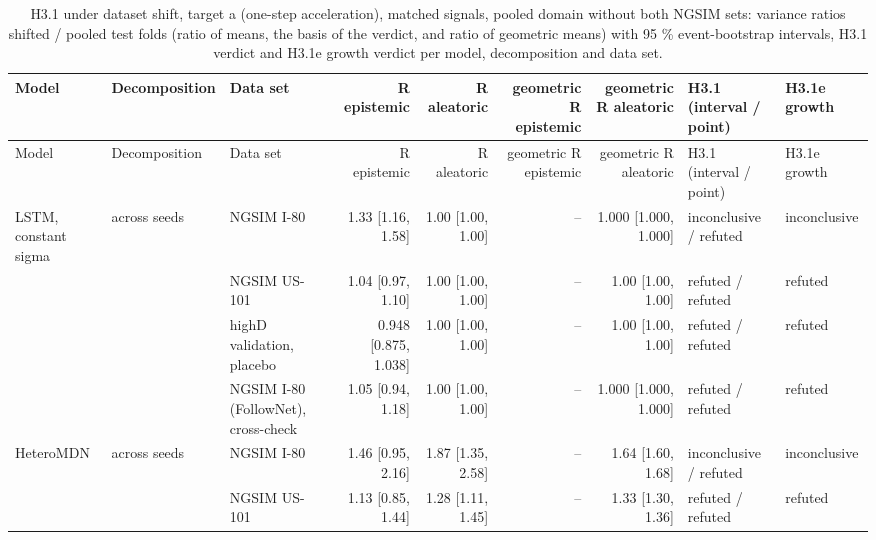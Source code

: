 \begingroup
\footnotesize
\begin{longtable}{lllrrrrll}
\caption{H3.1 under dataset shift, target a (one-step acceleration), matched signals, pooled domain without both NGSIM sets: variance ratios shifted / pooled test folds (ratio of means, the basis of the verdict, and ratio of geometric means) with 95 \% event-bootstrap intervals, H3.1 verdict and H3.1e growth verdict per model, decomposition and data set.}\label{tab:t2-h31--lodo-ngsim-all--a} \\
\toprule
Model & Decomposition & Data set & R epistemic & R aleatoric & geometric R epistemic & geometric R aleatoric & H3.1 (interval / point) & H3.1e growth \\
\midrule
\endfirsthead
\toprule
Model & Decomposition & Data set & R epistemic & R aleatoric & geometric R epistemic & geometric R aleatoric & H3.1 (interval / point) & H3.1e growth \\
\midrule
\endhead
\bottomrule
\endlastfoot
LSTM, constant sigma & across seeds & NGSIM I-80 & 1.33 [1.16, 1.58] & 1.00 [1.00, 1.00] & -- & 1.000 [1.000, 1.000] & inconclusive / refuted & inconclusive \\
 &  & NGSIM US-101 & 1.04 [0.97, 1.10] & 1.00 [1.00, 1.00] & -- & 1.00 [1.00, 1.00] & refuted / refuted & refuted \\
 &  & highD validation, placebo & 0.948 [0.875, 1.038] & 1.00 [1.00, 1.00] & -- & 1.00 [1.00, 1.00] & refuted / refuted & refuted \\
 &  & NGSIM I-80 (FollowNet), cross-check & 1.05 [0.94, 1.18] & 1.00 [1.00, 1.00] & -- & 1.000 [1.000, 1.000] & refuted / refuted & refuted \\
\midrule
HeteroMDN & across seeds & NGSIM I-80 & 1.46 [0.95, 2.16] & 1.87 [1.35, 2.58] & -- & 1.64 [1.60, 1.68] & inconclusive / refuted & inconclusive \\
 &  & NGSIM US-101 & 1.13 [0.85, 1.44] & 1.28 [1.11, 1.45] & -- & 1.33 [1.30, 1.36] & refuted / refuted & refuted \\

\end{longtable}
